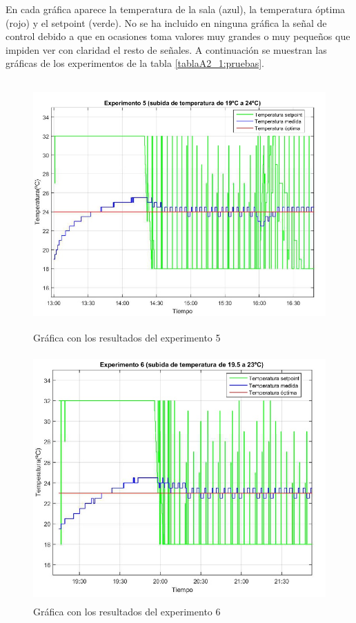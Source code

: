 	En cada gráfica aparece la temperatura de la sala (azul), la temperatura óptima (rojo) y el setpoint (verde). No se ha incluido en ninguna gráfica la señal de control debido a que en ocasiones toma valores muy grandes o muy pequeños que impiden ver con claridad el resto de señales. A continuación se muestran las gráficas de los experimentos de la tabla \ref{tablaA2_1:pruebas}.

\newpage

\begin{figure}[H]
\centering
\includegraphics[width=130mm,height=95mm]{imagenes/anexo2/experimento5}
\caption {Gráfica con los resultados del experimento 5}
\label{figA2_1:experimento5}
\end{figure}

\begin{figure}[H]
\centering
\includegraphics[width=130mm,height=95mm]{imagenes/anexo2/experimento6}
\caption {Gráfica con los resultados del experimento 6}
\label{figA2_2:experimento6}
\end{figure}

